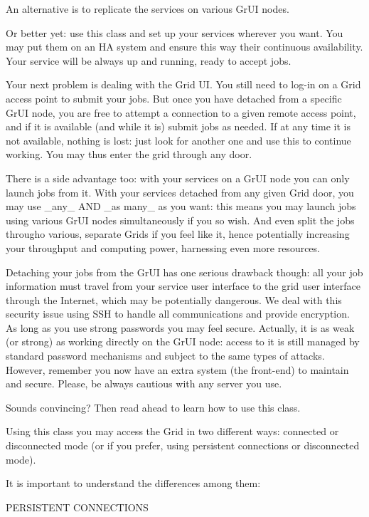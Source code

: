 An alternative is to replicate the services on various Gr\-UI nodes.

Or better yet: use this class and set up your services wherever you want. You may put them on an HA system and ensure this way their continuous availability. Your service will be always up and running, ready to accept jobs.

Your next problem is dealing with the Grid UI. You still need to log-in on a Grid access point to submit your jobs. But once you have detached from a specific Gr\-UI node, you are free to attempt a connection to a given remote access point, and if it is available (and while it is) submit jobs as needed. If at any time it is not available, nothing is lost: just look for another one and use this to continue working. You may thus enter the grid through any door.

There is a side advantage too: with your services on a Gr\-UI node you can only launch jobs from it. With your services detached from any given Grid door, you may use \_\-any\_\- AND \_\-as many\_\- as you want: this means you may launch jobs using various Gr\-UI nodes simultaneously if you so wish. And even split the jobs througho various, separate Grids if you feel like it, hence potentially increasing your throughput and computing power, harnessing even more resources.

Detaching your jobs from the Gr\-UI has one serious drawback though: all your job information must travel from your service user interface to the grid user interface through the Internet, which may be potentially dangerous. We deal with this security issue using SSH to handle all communications and provide encryption. As long as you use strong passwords you may feel secure. Actually, it is as weak (or strong) as working directly on the Gr\-UI node: access to it is still managed by standard password mechanisms and subject to the same types of attacks. However, remember you now have an extra system (the front-end) to maintain and secure. Please, be always cautious with any server you use.

Sounds convincing? Then read ahead to learn how to use this class.

Using this class you may access the Grid in two different ways: connected or disconnected mode (or if you prefer, using persistent connections or disconnected mode).

It is important to understand the differences among them:

PERSISTENT CONNECTIONS

